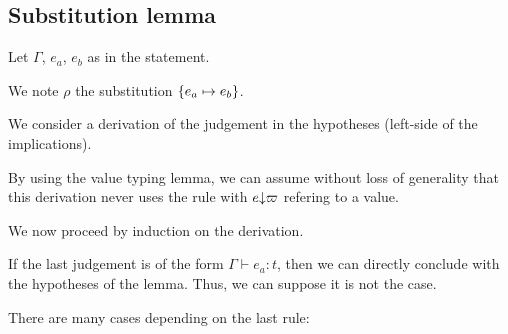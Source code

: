 \documentclass[a4paper]{article}
\theoremstyle{definition}
\begin{document}
        \subsection{Substitution lemma}

        Let $\Gamma$, $e_a$, $e_b$ as in the statement.

        We note $\rho$ the substitution $\{e_a \mapsto e_b\}$.

        We consider a derivation of the judgement in the hypotheses (left-side of the implications).

        By using the value typing lemma, we can assume without loss of generality that this derivation
        never uses the rule  with $e{\downarrow}\varpi$ refering to a value. 

        We now proceed by induction on the derivation.
        
        If the last judgement is of the form $\Gamma \vdash e_a: t$, then we can directly conclude with the hypotheses of the lemma.
        Thus, we can suppose it is not the case.

        There are many cases depending on the last rule:
\end{document}
